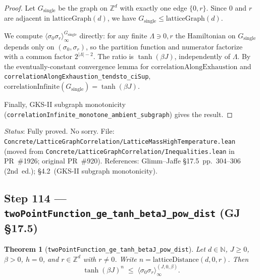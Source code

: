 \documentclass[a4paper,11pt]{article}
\newtheorem{theorem}{Theorem}
\begin{document}
\begin{proof}
Let $G_{\mathrm{single}}$ be the graph on $\mathbb{Z}^d$ with exactly one edge $\{0,r\}$.
Since $0$ and $r$ are adjacent in $\mathrm{latticeGraph}(d)$, we have $G_{\mathrm{single}} \le \mathrm{latticeGraph}(d)$.

We compute $\langle\sigma_0\sigma_r\rangle_\infty^{G_{\mathrm{single}}}$ directly:
for any finite $\Lambda \ni 0,r$ the Hamiltonian on $G_{\mathrm{single}}$ depends only on $(\sigma_0, \sigma_r)$,
so the partition function and numerator factorize with a common factor $2^{|\Lambda|-2}$.
The ratio is $\tanh(\beta J)$, independently of $\Lambda$.
By the eventually-constant convergence lemma for $\mathrm{correlationAlongExhaustion}$
and \texttt{correlationAlongExhaustion\_tendsto\_ciSup},
$\mathrm{correlationInfinite}(G_{\mathrm{single}}) = \tanh(\beta J)$.

Finally, GKS-II subgraph monotonicity (\texttt{correlationInfinite\_monotone\_ambient\_subgraph})
gives the result.
\end{proof}

\noindent\textit{Status}: Fully proved. No sorry.
File: \texttt{Concrete/LatticeGraphCorrelation/LatticeMassHighTemperature.lean} (moved from \texttt{Concrete/LatticeGraphCorrelation/Inequalities.lean} in PR~\#1926; original PR~\#920).
References: Glimm--Jaffe \S17.5~pp.~304--306 (2nd~ed.); \S4.2~(GKS-II subgraph monotonicity).

\subsection*{Step 114 — \texttt{twoPointFunction\_ge\_tanh\_betaJ\_pow\_dist} (GJ \S17.5)}

\begin{theorem}[\texttt{twoPointFunction\_ge\_tanh\_betaJ\_pow\_dist}]
Let $d \in \mathbb{N}$, $J \ge 0$, $\beta > 0$, $h = 0$, and $r \in \mathbb{Z}^d$ with $r \neq 0$.
Write $n = \mathrm{latticeDistance}(d,0,r)$.  Then
\[
  \tanh(\beta J)^n \;\le\; \langle\sigma_0\sigma_r\rangle_\infty^{(J,0,\beta)}.
\]
\end{theorem}
\end{document}
